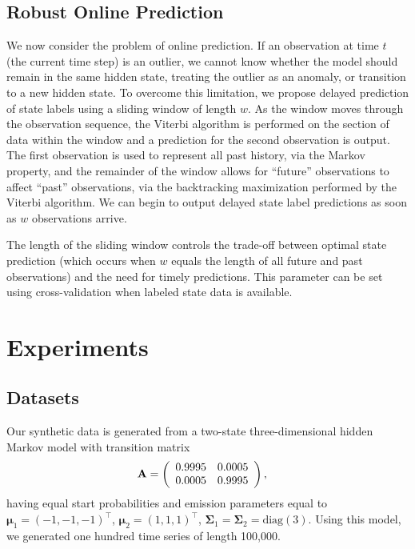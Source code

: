 \documentclass{article}
\begin{document}
\subsection{Robust Online Prediction}

We now consider the problem of online prediction. If an observation at time $t$ (the current time step) is an outlier, we cannot know whether the model should remain in the same hidden state, treating the outlier as an anomaly, or transition to a new hidden state. To overcome this limitation, we propose delayed prediction of state labels using a sliding window of length $w$. As the window moves through the observation sequence, the Viterbi algorithm is performed on the section of data within the window and a prediction for the second observation is output. The first observation is used to represent all past history, via the Markov property, and the remainder of the window allows for ``future'' observations to affect ``past'' observations, via the backtracking maximization performed by the Viterbi algorithm. We can begin to output delayed state label predictions as soon as $w$ observations arrive.

The length of the sliding window controls the trade-off between optimal state prediction (which occurs when $w$ equals the length of all future and past observations) and the need for timely predictions. This parameter can be set using cross-validation when labeled state data is available.

\section{Experiments}\label{sec:Experiments}


\subsection{Datasets}\label{sec:datasets}

Our synthetic data is generated from a two-state three-dimensional hidden Markov model with transition matrix
\begin{align*}
  \setlength{\abovedisplayskip}{0pt}
  \setlength{\belowdisplayskip}{0pt}
    \mathbf{A} &= \left( 
                   \begin{array}{ccc}
                    0.9995 & 0.0005 \\
                    0.0005 & 0.9995
                   \end{array}
                   \right),
\end{align*}
having equal start probabilities and emission parameters equal to $\mathbf{\mu}_1 = (-1, -1, -1)^\top$, $\mathbf{\mu}_2 = (1, 1, 1)^\top$, $\mathbf{\Sigma}_1 = \mathbf{\Sigma}_2 = \text{diag}(3)$. Using this model, we generated one hundred time series of length 100,000.
\end{document}
